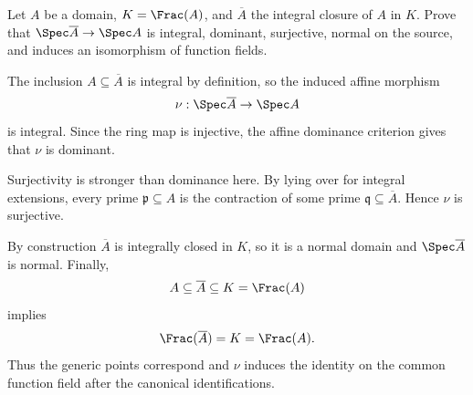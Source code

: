 \begin{problem}\label{prob:vi28-01}
Let \(A\) be a domain, \(K=\Frac(A)\), and \(\overline A\) the integral closure of \(A\) in \(K\). Prove that \(\Spec\overline A\to\Spec A\) is integral, dominant, surjective, normal on the source, and induces an isomorphism of function fields.

\end{problem}

\ifdefined\FullProblemDossiers
\begin{solution}
The inclusion \(A\subseteq\overline A\) is integral by definition, so the induced affine morphism
\[
\nu:\Spec\overline A\to\Spec A
\]
is integral. Since the ring map is injective, the affine dominance criterion gives that \(\nu\) is dominant.

Surjectivity is stronger than dominance here. By lying over for integral extensions, every prime
\(\mathfrak p\subseteq A\) is the contraction of some prime
\(\mathfrak q\subseteq\overline A\). Hence \(\nu\) is surjective.

By construction \(\overline A\) is integrally closed in \(K\), so it is a normal domain and
\(\Spec\overline A\) is normal. Finally,
\[
A\subseteq\overline A\subseteq K=\Frac(A)
\]
implies
\[
\Frac(\overline A)=K=\Frac(A).
\]
Thus the generic points correspond and \(\nu\) induces the identity on the common function field after the canonical identifications.
\end{solution}
\fi
